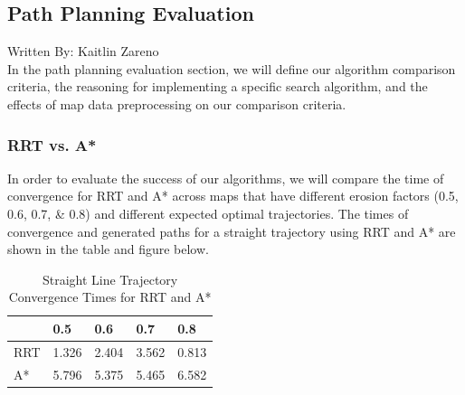 \documentclass{article}
\begin{document}
\subsection{Path Planning Evaluation}
Written By: Kaitlin Zareno\\

In the path planning evaluation section, we will define our algorithm comparison criteria, the reasoning for implementing a specific search algorithm, and the effects of map data preprocessing on our comparison criteria. 

\subsubsection{RRT vs. A*}
In order to evaluate the success of our algorithms, we will compare the time of convergence for RRT and A* across maps that have different erosion factors (0.5, 0.6, 0.7, & 0.8) and different expected optimal trajectories. The times of convergence and generated paths for a straight trajectory using RRT and A* are shown in the table and figure below.

\begin{table}[ht]
    \centering
    \begin{tabular}{|l|l|l|l|l|}
        \hline
        & 0.5 & 0.6 & 0.7 & 0.8\\\hline
        RRT & 1.326 & 2.404 & 3.562 & 0.813 \\\hline
        A* & 5.796 & 5.375 & 5.465 & 6.582\\ \hline
    \end{tabular}
    \caption{Straight Line Trajectory Convergence Times for RRT and A*\label{BACtable}}
\end{table}
\end{document}
